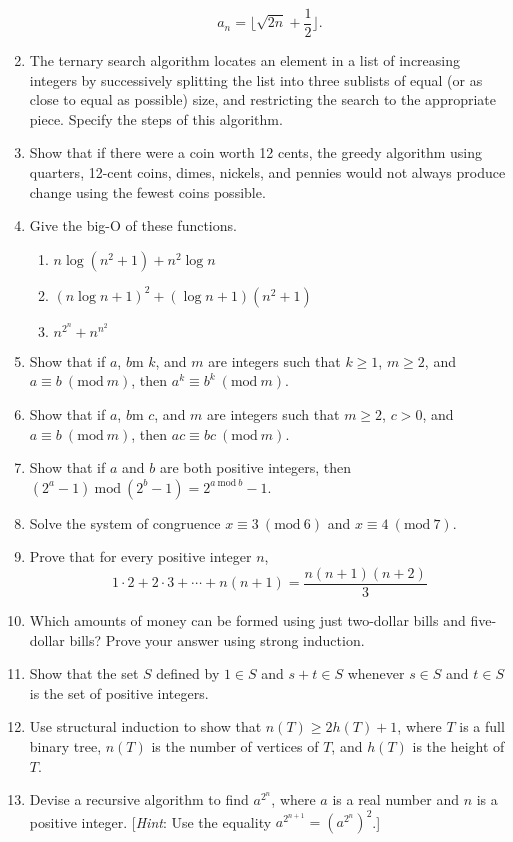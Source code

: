\documentclass[letterpaper, 12pt]{article}
\newcommand{\PMod}[1]{\ (\mathrm{mod}\ #1)}
\newcommand{\Mod}[1]{\ \mathrm{mod}\ #1}
\begin{document}
\begin{enumerate}
    \[a_n = \lfloor \sqrt{2n} + \frac{1}{2} \rfloor.\]
    \item The ternary search algorithm locates an element in a list of increasing integers by successively splitting the list into three sublists of equal (or as close to equal as possible) size, and restricting the search to the appropriate piece. Specify the steps of this algorithm.
    \item Show that if there were a coin worth 12 cents, the greedy algorithm using quarters, 12-cent coins, dimes, nickels, and pennies would not always produce change using the fewest coins possible.
    \item Give the big-O of these functions.
    \begin{enumerate}
        \item $n \log(n^2 + 1) + n^2\log n$
        \item $(n\log n + 1)^2 + (\log n + 1)(n^2 + 1)$
        \item $n^{2^n} + n^{n^2}$
    \end{enumerate}
    \item Show that if $a$, $b$m $k$, and $m$ are integers such that $k \geq 1$, $m \geq 2$, and $a \equiv b \PMod{m}$, then $a^k \equiv b^k \PMod{m}$.
    \item Show that if $a$, $b$m $c$, and $m$ are integers such that $m \geq 2$, $c > 0$, and $a \equiv b \PMod{m}$, then $ac \equiv bc \PMod{m}$.
    \item Show that if $a$ and $b$ are both positive integers, then $(2^a - 1) \Mod{(2^b - 1)} = 2^{a \Mod{b}} - 1$.
    \item Solve the system of congruence $x \equiv 3 \PMod{6}$ and $x \equiv 4 \PMod{7}$.
    \item Prove that for every positive integer $n$,
    \[1 \cdot 2 + 2 \cdot 3 + \cdots + n(n + 1) = \frac{n(n + 1)(n + 2)}{3}\]
    \item Which amounts of money can be formed using just two-dollar bills and five-dollar bills? Prove your answer using strong induction.
    \item Show that the set $S$ defined by $1 \in S$ and $s + t \in S$ whenever $s \in S$ and $t \in S$ is the set of positive integers.
    \item Use structural induction to show that $n(T) \geq 2h(T) + 1$, where $T$ is a full binary tree, $n(T)$ is the number of vertices of $T$, and $h(T)$ is the height of $T$.
    \item Devise a recursive algorithm to find $a^{2^n}$, where $a$ is a real number and $n$ is a positive integer. [\textit{Hint}: Use the equality $a^{2^{n+1}} = (a^{2^n})^2$.]
\end{enumerate}
\end{document}
